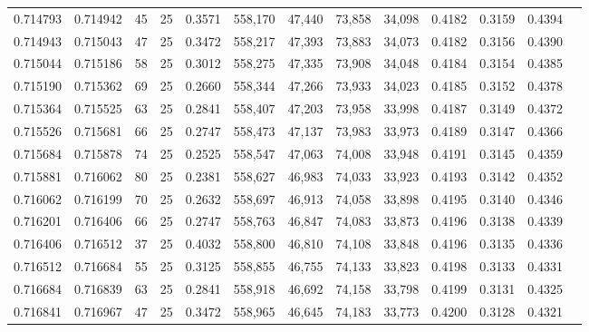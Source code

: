 \begin{tabular}{rrrrrrrrrrrrr}
0.714793 & 0.714942 &    45 &  25 &                                     0.3571 & 558,170 &  47,440 &  73,858 &  34,098 & 0.4182 & 0.3159 & 0.4394 \\
0.714943 & 0.715043 &    47 &  25 &                                     0.3472 & 558,217 &  47,393 &  73,883 &  34,073 & 0.4182 & 0.3156 & 0.4390 \\
0.715044 & 0.715186 &    58 &  25 &                                     0.3012 & 558,275 &  47,335 &  73,908 &  34,048 & 0.4184 & 0.3154 & 0.4385 \\
0.715190 & 0.715362 &    69 &  25 &                                     0.2660 & 558,344 &  47,266 &  73,933 &  34,023 & 0.4185 & 0.3152 & 0.4378 \\
0.715364 & 0.715525 &    63 &  25 &                                     0.2841 & 558,407 &  47,203 &  73,958 &  33,998 & 0.4187 & 0.3149 & 0.4372 \\
0.715526 & 0.715681 &    66 &  25 &                                     0.2747 & 558,473 &  47,137 &  73,983 &  33,973 & 0.4189 & 0.3147 & 0.4366 \\
0.715684 & 0.715878 &    74 &  25 &                                     0.2525 & 558,547 &  47,063 &  74,008 &  33,948 & 0.4191 & 0.3145 & 0.4359 \\
0.715881 & 0.716062 &    80 &  25 &                                     0.2381 & 558,627 &  46,983 &  74,033 &  33,923 & 0.4193 & 0.3142 & 0.4352 \\
0.716062 & 0.716199 &    70 &  25 &                                     0.2632 & 558,697 &  46,913 &  74,058 &  33,898 & 0.4195 & 0.3140 & 0.4346 \\
0.716201 & 0.716406 &    66 &  25 &                                     0.2747 & 558,763 &  46,847 &  74,083 &  33,873 & 0.4196 & 0.3138 & 0.4339 \\
0.716406 & 0.716512 &    37 &  25 &                                     0.4032 & 558,800 &  46,810 &  74,108 &  33,848 & 0.4196 & 0.3135 & 0.4336 \\
0.716512 & 0.716684 &    55 &  25 &                                     0.3125 & 558,855 &  46,755 &  74,133 &  33,823 & 0.4198 & 0.3133 & 0.4331 \\
0.716684 & 0.716839 &    63 &  25 &                                     0.2841 & 558,918 &  46,692 &  74,158 &  33,798 & 0.4199 & 0.3131 & 0.4325 \\
0.716841 & 0.716967 &    47 &  25 &                                     0.3472 & 558,965 &  46,645 &  74,183 &  33,773 & 0.4200 & 0.3128 & 0.4321 \\

\end{tabular}
